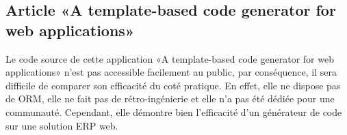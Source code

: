 

\subsection{Article «A template-based code generator for web applications»}
Le code source de cette application «A template-based code generator for web applications» n’est pas accessible facilement au public, par conséquence, il sera difficile de comparer son efficacité du coté pratique. En effet, elle ne dispose pas de ORM, elle ne fait pas de rétro-ingénierie et elle n'a pas été dédiée pour une communauté. Cependant, elle démontre bien l'efficacité d'un générateur de code sur une solution ERP web.
